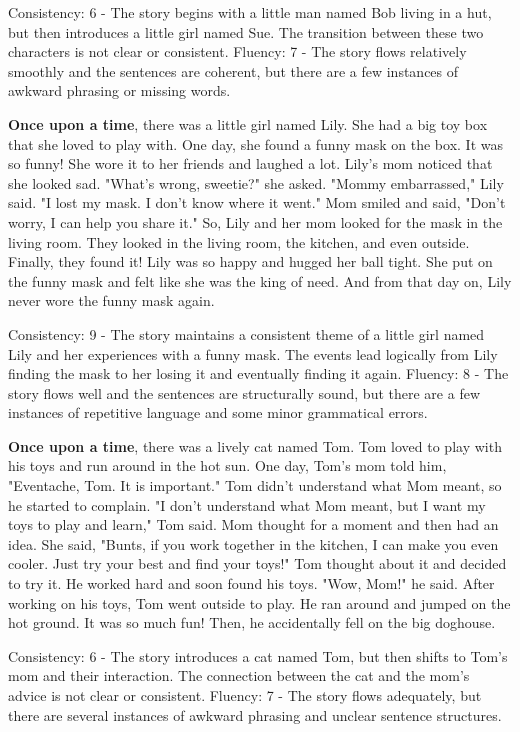 \documentclass{article}
\begin{document}
Consistency: 6 - The story begins with a little man named Bob living in a hut, but then introduces a little girl named Sue. The transition between these two characters is not clear or consistent.
Fluency: 7 - The story flows relatively smoothly and the sentences are coherent, but there are a few instances of awkward phrasing or missing words.

\textbf{Once upon a time}, there was a little girl named Lily. She had a big toy box that she loved to play with. One day, she found a funny mask on the box. It was so funny! She wore it to her friends and laughed a lot. Lily's mom noticed that she looked sad. "What's wrong, sweetie?" she asked. "Mommy embarrassed," Lily said. "I lost my mask. I don't know where it went." Mom smiled and said, "Don't worry, I can help you share it." So, Lily and her mom looked for the mask in the living room. They looked in the living room, the kitchen, and even outside. Finally, they found it! Lily was so happy and hugged her ball tight. She put on the funny mask and felt like she was the king of need. And from that day on, Lily never wore the funny mask again.

Consistency: 9 - The story maintains a consistent theme of a little girl named Lily and her experiences with a funny mask. The events lead logically from Lily finding the mask to her losing it and eventually finding it again.
Fluency: 8 - The story flows well and the sentences are structurally sound, but there are a few instances of repetitive language and some minor grammatical errors.

\textbf{Once upon a time}, there was a lively cat named Tom. Tom loved to play with his toys and run around in the hot sun. One day, Tom's mom told him, "Eventache, Tom. It is important." Tom didn't understand what Mom meant, so he started to complain. "I don't understand what Mom meant, but I want my toys to play and learn," Tom said. Mom thought for a moment and then had an idea. She said, "Bunts, if you work together in the kitchen, I can make you even cooler. Just try your best and find your toys!" Tom thought about it and decided to try it. He worked hard and soon found his toys. "Wow, Mom!" he said. After working on his toys, Tom went outside to play. He ran around and jumped on the hot ground. It was so much fun! Then, he accidentally fell on the big doghouse.

Consistency: 6 - The story introduces a cat named Tom, but then shifts to Tom's mom and their interaction. The connection between the cat and the mom's advice is not clear or consistent.
Fluency: 7 - The story flows adequately, but there are several instances of awkward phrasing and unclear sentence structures.
\end{document}
